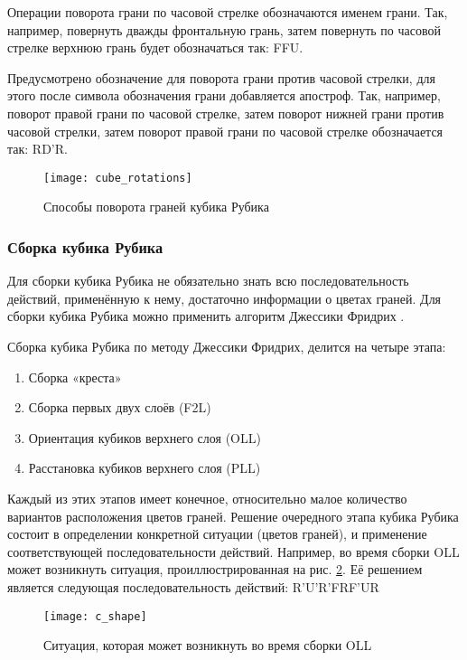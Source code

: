 Операции поворота грани по часовой стрелке обозначаются именем грани. Так, например, повернуть дважды фронтальную грань, затем повернуть по часовой стрелке верхнюю грань будет обозначаться так: FFU.

Предусмотрено обозначение для поворота грани против часовой стрелки, для этого после символа обозначения грани добавляется апостроф. Так, например, поворот правой грани по часовой стрелке, затем поворот нижней грани против часовой стрелки, затем поворот правой грани по часовой стрелке обозначается так: RD’R.

\begin{figure}[ht]
	\centering
	\texttt{[image: cube\_rotations]}
	\caption{Способы поворота граней кубика Рубика}
	\label{fig:cube_rotations}
\end{figure}

\subsubsection{Сборка кубика Рубика}
Для сборки кубика Рубика не обязательно знать всю последовательность действий, применённую к нему, достаточно информации о цветах граней. Для сборки кубика Рубика можно применить алгоритм Джессики Фридрих \cite{bib:fridrich}.

Сборка кубика Рубика по методу Джессики Фридрих, делится на четыре этапа:
\begin{enumerate}
	\item Сборка «креста»
	\item Сборка первых двух слоёв (F2L)
	\item Ориентация кубиков верхнего слоя (OLL)
	\item Расстановка кубиков верхнего слоя (PLL)
\end{enumerate}

Каждый из этих этапов имеет конечное, относительно малое количество вариантов расположения цветов граней. Решение очередного этапа кубика Рубика состоит в определении конкретной ситуации (цветов граней), и применение соответствующей последовательности действий. Например, во время сборки OLL может возникнуть ситуация, проиллюстрированная на рис. \ref{fig:c_shape}. Её решением является следующая последовательность действий: R'U'R'FRF'UR

\begin{figure}[ht]
	\centering
	\texttt{[image: c\_shape]}
	\caption{Ситуация, которая может возникнуть во время сборки OLL}
	\label{fig:c_shape}
\end{figure}

